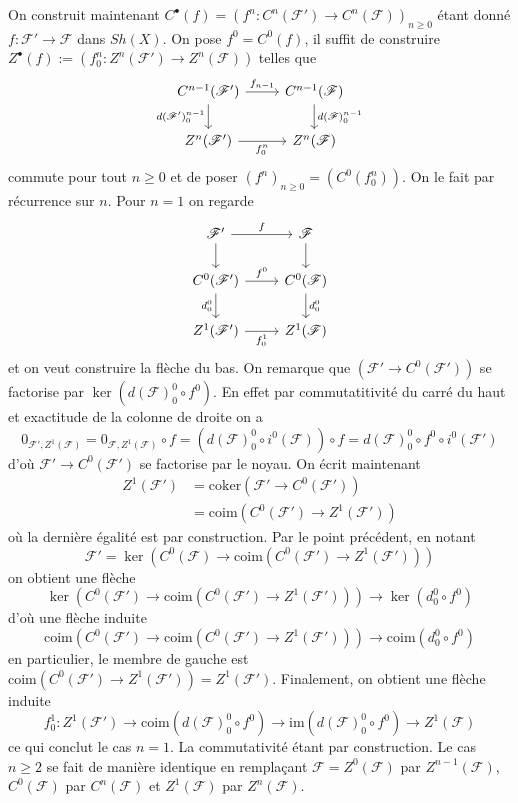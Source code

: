 \documentclass[a4paper,12pt]{article}
\newcommand{\F}{\mathscr F}
\newcommand{\im}{\textrm{im}}
\newcommand{\coker}{\textrm{coker}}
\newcommand{\coim}{\textrm{coim}}
\theoremstyle{plain}
\theoremstyle{definition}
\theoremstyle{remark}
\begin{document}
On construit maintenant 
$C^\bullet(f)=(f^n\colon C^n(\F')\to C^n(\F))_{n\geq 0}$ 
étant donné $f \colon \F'\to \F$ dans $Sh(X)$. On pose
$f^0=C^0(f)$, il suffit de construire $Z^\bullet(f):=
(f_0^n\colon Z^n(\F')\to Z^n(\F))$ telles que 
\[\begin{tikzcd}
	{C^{n-1}(\F')} & {C^{n-1}(\F)} \\
	{Z^n(\F')} & {Z^n(\F)}
	\arrow["{f_{n-1}}", from=1-1, to=1-2]
	\arrow["{d(\F')_0^{n-1}}"', from=1-1, to=2-1]
	\arrow["{d(\F)_0^{n-1}}", from=1-2, to=2-2]
	\arrow["{f_0^{n}}"', from=2-1, to=2-2]
\end{tikzcd}\]
commute pour tout $n\geq 0$ et de poser $(f^n)_{n\geq0}=(C^0(f_0^n))$.
On le fait par récurrence sur $n$. Pour $n=1$ on regarde
\[\begin{tikzcd}
	{\F'} & \F \\
	{C^{0}(\F')} & {C^{0}(\F)} \\
	{Z^1(\F')} & {Z^1(\F)}
	\arrow["f", from=1-1, to=1-2]
	\arrow[from=1-1, to=2-1]
	\arrow[from=1-2, to=2-2]
	\arrow["{f^0}", from=2-1, to=2-2]
	\arrow["{d_0^{0}}"', from=2-1, to=3-1]
	\arrow["{d_0^{0}}", from=2-2, to=3-2]
	\arrow["{f_0^1}"', from=3-1, to=3-2]
\end{tikzcd}\]
et on veut construire la flèche du bas. On remarque que
$(\F'\to C^0(\F'))$ se factorise par $\ker(d(\F)_0^0\circ f^0)$. En effet
par commutatitivité du carré du haut et exactitude de la colonne de
droite on a
\[0_{\F',Z^1(\F)}=0_{\F,Z^1(\F)}\circ f=(d(\F)_0^0\circ i^0(\F))\circ f=d(\F)_0^0\circ f^0\circ
i^0(\F')\] 
d'où $\F'\to C^0(\F')$ se factorise par le noyau. On écrit maintenant
\begin{align*}
	Z^1(\F')&=\coker(\F'\to C^0(\F'))\\
		&=\coim(C^0(\F')\to Z^1(\F'))
\end{align*}
où la dernière égalité est par construction. Par le point précédent,
en notant 
\[\F'=\ker\left(C^0(\F)\to \coim(C^0(\F')\to Z^1(\F'))\right)\]
on obtient une flèche
\[\ker\left(C^0(\F')\to \coim(C^0(\F')\to Z^1(\F'))\right)\to \ker(d_0^0\circ f^0)\]
d'où une flèche induite 
\[\coim\left(C^0(\F')\to \coim(C^0(\F')\to Z^1(\F'))\right)\to \coim(d_0^0\circ f^0)\]
en particulier, le membre de gauche est 
$\coim(C^0(\F')\to Z^1(\F'))=Z^1(\F')$. Finalement, on obtient
une flèche induite
\[f_0^1\colon Z^1(\F')\to \coim(d(\F)_0^0\circ f^0)\to\im(d(\F)_0^0\circ f^0) \to Z^1(\F)\] 
ce qui conclut le cas $n=1$. La commutativité étant par construction.
Le cas $n\geq 2$ se fait de manière identique en remplaçant $\F=Z^0(\F)$
par $Z^{n-1}(\F)$, $C^0(\F)$ par $C^n(\F)$ et $Z^1(\F)$ par $Z^n(\F)$.
\newline
\end{document}
